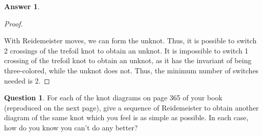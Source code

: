 \documentclass[article, 12pt]{article}
\theoremstyle{definition}
\newtheorem{question}{Question}
\newtheorem{answer}{Answer}
\begin{document}
\begin{answer}
\begin{proof}
\begin{figure}[H]
                \centering
            \end{figure}
            With Reidemeister moves, we can form the unknot. Thus, it is possible to switch 2 crossings of the trefoil knot to obtain an unknot. It is impossible to switch 1 crossing of the trefoil knot to obtain an unknot, as it has the invariant of being three-colored, while the unknot does not. Thus, the minimum number of switches needed is 2.
        \end{proof}
    \end{answer}

    \begin{question}
        For each of the knot diagrams on page 365 of your book (reproduced on the next page), give a sequence of Reidemeister to obtain another diagram of the same knot which you feel is as simple as possible. In each case, how do you know you can't do any better?
    \end{question}
\end{document}
